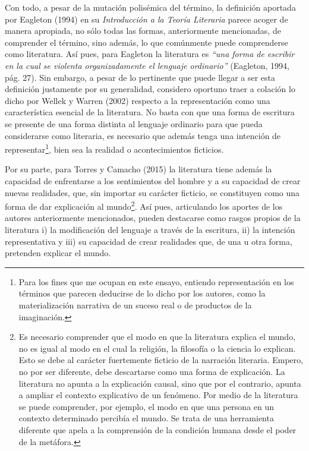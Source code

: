 \begin{refsection}
Con todo, a pesar de la mutación polisémica del término, la definición aportada por Eagleton (1994) en su \emph{Introducción a la Teoría Literaria} parece acoger de manera apropiada, no sólo todas las formas, anteriormente mencionadas, de comprender el término, sino además, lo que comúnmente puede comprenderse como literatura. Así pues, para Eagleton la literatura es \emph{``una forma de escribir en la cual se violenta organizadamente el lenguaje ordinario''} (Eagleton, 1994, pág. 27). Sin embargo, a pesar de lo pertinente que puede llegar a ser esta definición justamente por su generalidad, considero oportuno traer a colación lo dicho por Wellek y Warren (2002) respecto a la representación como una característica esencial de la literatura. No basta con que una forma de escritura se presente de una forma distinta al lenguaje ordinario para que pueda considerarse como literaria, es necesario que además tenga una intención de representar\footnote{Para los fines que me ocupan en este ensayo, entiendo representación en los términos que parecen deducirse de lo dicho por los autores, como la materialización narrativa de un suceso real o de productos de la imaginación.}, bien sea la realidad o acontecimientos ficticios.

Por su parte, para Torres y Camacho (2015) la literatura tiene además la capacidad de enfrentarse a los sentimientos del hombre y a su capacidad de crear nuevas realidades, que, sin importar su carácter ficticio, se constituyen como una forma de dar explicación al mundo\footnote{Es necesario comprender que el modo en que la literatura explica el mundo, no es igual al modo en el cual la religión, la filosofía o la ciencia lo explican. Esto se debe al carácter fuertemente ficticio de la narración literaria. Empero, no por ser diferente, debe descartarse como una forma de explicación. La literatura no apunta a la explicación causal, sino que por el contrario, apunta a ampliar el contexto explicativo de un fenómeno. Por medio de la literatura se puede comprender, por ejemplo, el modo en que una persona en un contexto determinado percibía el mundo. Se trata de una herramienta diferente que apela a la comprensión de la condición humana desde el poder de la metáfora.}. Así pues, articulando los aportes de los autores anteriormente mencionados, pueden destacarse como rasgos propios de la literatura i) la modificación del lenguaje a través de la escritura, ii) la intención representativa y iii) su capacidad de crear realidades que, de una u otra forma, pretenden explicar el mundo.


\end{refsection}
